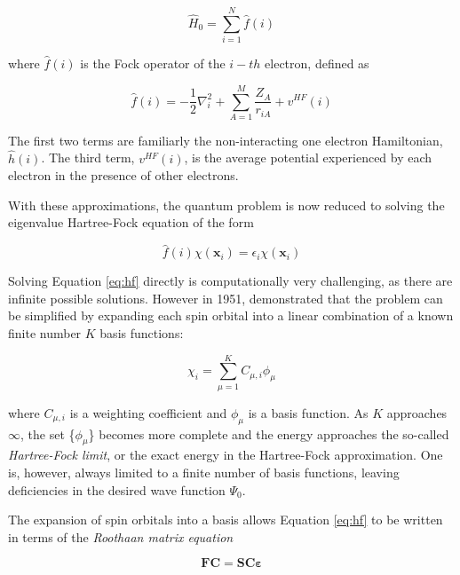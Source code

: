 \begin{equation}
\hat{H}_0 = \sum_{i=1}^N \hat{f}(i)
\end{equation}

\noindent where $\hat{f}(i)$ is the Fock operator of the $i-th$ electron, defined as

\begin{equation}
  \hat{f}(i) = -\frac{1}{2}\nabla^2_i + \sum_{A=1}^M\frac{Z_A}{r_{iA}} + v^{HF}(i)
\end{equation}

\noindent The first two terms are familiarly the non-interacting one electron Hamiltonian, $\hat{h}(i)$. The third term, $v^{HF}(i)$, is the average potential experienced by each electron in the presence of other electrons.

With these approximations, the quantum problem is now reduced to solving the eigenvalue Hartree-Fock equation of the form

\begin{equation}
\hat{f}(i)\chi(\mathbf{x}_i) = \epsilon_i\chi(\mathbf{x}_i)
\label{eq:hf}
\end{equation}

Solving Equation \ref{eq:hf} directly is computationally very challenging, as there are infinite possible solutions.  However in 1951, \citet{Roothaan1951} demonstrated that the problem can be simplified by expanding each spin orbital into a linear combination of a known finite number $K$ basis functions:

\begin{equation}
\chi_i = \sum_{\mu=1}^K C_{\mu,i}\phi_{\mu}
\end{equation}

\noindent where $C_{\mu,i}$ is a weighting coefficient and $\phi_{\mu}$ is a basis function. As $K$ approaches $\infty$, the set \{$\phi_{\mu}$\} becomes more complete and the energy approaches the so-called \emph{Hartree-Fock limit}, or the exact energy in the Hartree-Fock approximation. One is, however, always limited to a finite number of basis functions, leaving deficiencies in the desired wave function $\Psi_0$.

The expansion of spin orbitals into a basis allows Equation \ref{eq:hf} to be written in terms of the \emph{Roothaan matrix equation}

\begin{equation}
\mathbf{F}\mathbf{C} = \mathbf{S}\mathbf{C}\mathbf{\varepsilon}
\label{eq:roothan}
\end{equation}

